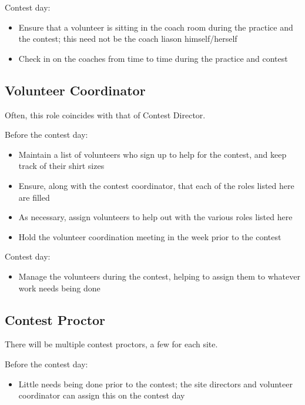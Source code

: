 \documentclass[11pt,twoside,letterpaper]{book}
\newenvironment{itemlist}{
\begin{itemize}
\setlength{\itemsep}{0pt}
\setlength{\parskip}{0pt}}
{\end{itemize}}
\begin{document}
\noindent Contest day:

\begin{itemlist}
\item Ensure that a volunteer is sitting in the coach room during the
  practice and the contest; this need not be the coach liason
  himself/herself
\item Check in on the coaches from time to time during the practice
  and contest
\end{itemlist}


\subsection{Volunteer Coordinator}

Often, this role coincides with that of Contest Director.

\noindent Before the contest day:

\begin{itemlist}
\item Maintain a list of volunteers who sign up to help for the
  contest, and keep track of their shirt sizes
\item Ensure, along with the contest coordinator, that each of the
  roles listed here are filled
\item As necessary, assign volunteers to help out with the various
  roles listed here
\item Hold the volunteer coordination meeting in the week prior to the
  contest
\end{itemlist}

\noindent Contest day:

\begin{itemlist}
\item Manage the volunteers during the contest, helping to assign them
  to whatever work needs being done
\end{itemlist}



\subsection{Contest Proctor}

There will be multiple contest proctors, a few for each site.

\noindent Before the contest day:

\begin{itemlist}
\item Little needs being done prior to the contest; the site directors
  and volunteer coordinator can assign this on the contest day
\end{itemlist}
\end{document}

